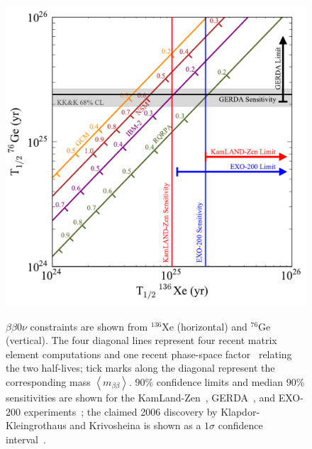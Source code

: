 \begin{figure}
\begin{center}
\includegraphics[keepaspectratio=true,width=\textwidth]{MatplotLibSensitivity.pdf}
\end{center}
\renewcommand{\baselinestretch}{1}
\small\normalsize
\begin{quote}
\caption{$\beta\beta 0\nu$ constraints are shown from $^{136}$Xe (horizontal) and $^{76}$Ge (vertical).  The four diagonal lines represent four recent matrix element computations \cite{PhysRevLett.105.252503,Menéndez2009139,PhysRevC.87.014315,PhysRevC.87.045501} and one recent phase-space factor~\cite{PhysRevC.85.034316} relating the two half-lives; tick marks along the diagonal represent the corresponding mass $\left<m_{\beta\beta}\right>$.  $90\%$ confidence limits and median $90\%$ sensitivities are shown for the KamLand-Zen~\cite{PhysRevLett.110.062502}, GERDA~\cite{PhysRevLett.111.122503}, and EXO-200 experiments~\cite{NewEXObb0nPaper_2014}; the claimed 2006 discovery by Klapdor-Kleingrothaus and Krivosheina is shown as a $1\sigma$ confidence interval~\cite{Klapdor}.}
\label{fig:MatplotlibSensitivity}
\end{quote}
\end{figure}
\renewcommand{\baselinestretch}{2}
\small\normalsize

